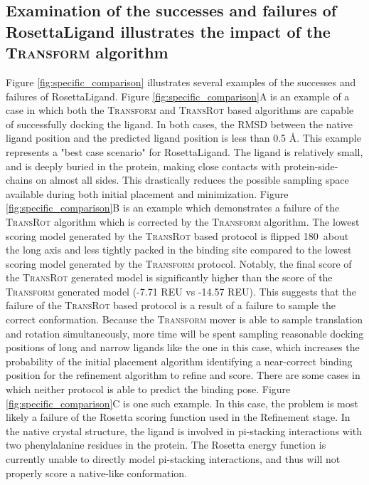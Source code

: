 \subsection{Examination of the successes and failures of RosettaLigand illustrates the impact of the \textsc{Transform} algorithm}
Figure \ref{fig:specific_comparison} illustrates several examples of the successes and failures of RosettaLigand.
Figure \ref{fig:specific_comparison}A is an example of a case in which both the \textsc{Transform} and \textsc{TransRot} based algorithms are capable of successfully docking the ligand.
In both cases, the RMSD between the native ligand position and the predicted ligand position is less than 0.5 \AA.  This example represents a 
"best case scenario" for RosettaLigand.
The ligand is relatively small, and is deeply buried in the protein, making close contacts with protein-side-chains on almost all sides.
This drastically reduces the possible sampling space available during both initial placement and minimization.
Figure \ref{fig:specific_comparison}B is an example which demonstrates a failure of the \textsc{TransRot} algorithm which is corrected by the \textsc{Transform} algorithm.
The lowest scoring model generated by the \textsc{TransRot} based protocol is flipped 180\textdegree\ about the long axis and less tightly packed in the binding site compared to the lowest scoring model generated by the \textsc{Transform} protocol.
Notably, the final score of the \textsc{TransRot} generated model is significantly higher than the score of the \textsc{Transform} generated model (-7.71 REU vs -14.57 REU). 
This suggests that the failure of the \textsc{TransRot} based protocol is a result of a failure to sample the correct conformation.
Because the \textsc{Transform} mover is able to sample translation and rotation simultaneously, more time will be spent sampling reasonable docking positions of long and narrow ligands like the one in this case, which increases the probability of the initial placement algorithm identifying a near-correct binding position for the refinement algorithm to refine and score.
There are some cases in which neither protocol is able to predict the binding pose.
Figure \ref{fig:specific_comparison}C is one such example.  In this case, the problem is most likely a failure of the Rosetta scoring function used in the Refinement stage.
In the native crystal structure, the ligand is involved in pi-stacking interactions with two phenylalanine residues in the protein.
The Rosetta energy function is currently unable to directly model pi-stacking interactions, and thus will not properly score a native-like conformation. 

